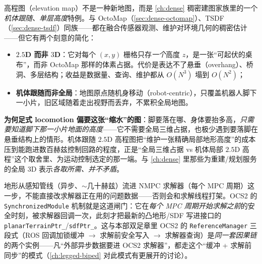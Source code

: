 \begin{insight}[高程图 = 随机体移动的 \texorpdfstring{$2.5$}{2.5}D 稠密建图]\label{ins:lp-elevation}
高程图（elevation map）不是一种新地图，而是 \cref{ch:dense} 稠密建图家族里的一个\emph{机体跟随、单层高度}特例。与 OctoMap（\cref{sec:dense-octomap}）、TSDF（\cref{sec:dense-tsdf}）同族——都在融合传感器观测、维护对环境几何的稠密估计——但它有两个刻意的简化：
\begin{itemize}
  \item \textbf{$2.5$D 而非 $3$D}：它对每个 $(x,y)$ 栅格只存\emph{一个}高度 $z$，是一张“可起伏的桌布”，而非 OctoMap 那样的体素占据。代价是表达不了悬垂（overhang）、桥洞、多层结构；收益是数据量、查询、维护都从 $O(N^3)$ 塌到 $O(N^2)$；
  \item \textbf{机体跟随而非全局}：地图原点随机身移动（robot-centric），只覆盖机器人脚下一小片，旧区域随着走出视野而丢弃，不累积全局地图。
\end{itemize}
\textbf{为何足式 locomotion 偏要这张“缩水”的图}：脚要落在哪、身体要抬多高，\emph{只需要知道脚下那一小片地面的高度}——它不需要全局三维占据，也极少遇到要落脚在悬垂结构上的情形。机体跟随 $2.5$D 高程图把“维护一张精确局部地形高度”的成本压到能跑进数百赫兹控制回路的程度，正是“全局三维占据 vs 机体局部 $2.5$D 高程”这个取舍里、为运动控制选定的那一端。与 \cref{ch:dense} 里那些为重建/规划服务的全局 $3$D 表示\emph{各取所需、并不矛盾}。
\end{insight}

\begin{insight}\label{ins:lp-sync}
地形从感知管线（异步、$\sim$几十赫兹）流进 NMPC 求解器（每个 MPC 周期）这一步，不能直接改求解器正在用的问题数据——否则会和求解线程打架。OCS2 的 \texttt{SynchronizedModule} 机制就是这道闸门：它在\emph{每个 MPC 周期开始求解之前}的安全时刻，被求解器回调一次，此刻才把最新的凸地形/SDF 写进接口的 \texttt{planarTerrainPtr\_}/\allowbreak\texttt{sdfPtr\_}。这与本部双足章里 OCS2 的 \texttt{ReferenceManager} 三段式（ROS 回调加锁缓冲 $\to$ 求解前安全写入 $\to$ 求解器查询）是\emph{同一套因果链}的两个实例——凡“外部异步数据要进 OCS2 求解器”，都走这个“缓冲 + 求解前同步”的模式（\cref{ch:legged-biped} 对此模式有更展开的讨论）。
\end{insight}

